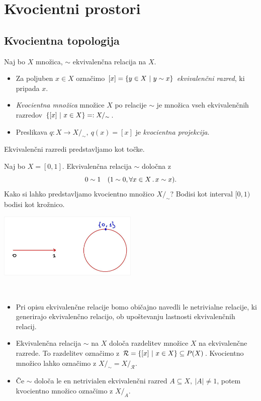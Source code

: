 \section{Kvocientni prostori}
\subsection{Kvocientna topologija}
\begin{definicija}
    Naj bo \(X\) množica, \(\sim\) ekvivalenčna relacija na \(X\). 
    \begin{itemize}
        \item Za poljuben \(x \in X\) označimo \([x] = \left\{y \in X \ | \ y \sim x\right\}\) \emph{ekvivalenčni razred}, ki pripada \(x\).
        \item \emph{Kvocientna množica} množice \(X\) po relacije \(\sim\) je množica vseh ekvivalenčnih razredov \(\left\{[x] \ | \ x \in X\right\} =: X/_\sim\).
        \item Preslikava \(q: X \to X/_\sim, \ q(x) = [x]\) je \emph{kvocientna projekcija}.
    \end{itemize}    
\end{definicija}

\begin{opomba}
    Ekvivalenčni razredi predstavljamo kot točke.
\end{opomba}

\begin{primer}
    Naj bo \(X = [0, 1]\). Ekvivalenčna relacija \(\sim\) določna z \[0 \sim 1 \quad (1 \sim 0, \forall x \in X \,.\,x \sim x).\]
    Kako si lahko predstavljamo kvocientno množico \(X/_\sim\)? Bodisi kot interval \([0,1)\) bodisi kot krožnico.
    \begin{center}
        \includegraphics[width=0.5\textwidth]{img/01_001.jpg}      
    \end{center}
\end{primer}

\begin{opomba}
    \
    \begin{itemize}
        \item Pri opisu ekvivalenčne relacije bomo običajno navedli le netrivialne relacije, ki generirajo ekvivalenčno relacijo, ob upoštevanju lastnosti ekvivalenčnih relacij.
        \item Ekvivalenčna relacija \(\sim\) na \(X\) določa razdelitev množice \(X\) na ekvivalenčne razrede. To razdelitev označimo z \(\mathcal{R} = \left\{[x] \ | \ x \in X\right\} \subseteq P(X)\). Kvocientno množico lahko označimo z \(X/_\sim = X/_\mathcal{R}\).
        \item Če \(\sim\) določa le en netrivialen ekvivalenčni razred \(A \subseteq X, \ |A| \neq 1\), potem kvocientno množico označimo z \(X/_A\).
    \end{itemize}
\end{opomba}

